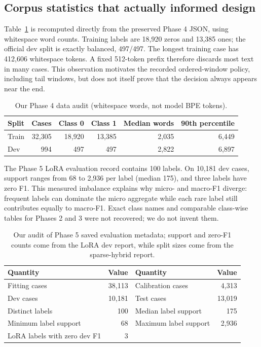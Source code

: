 \documentclass[11pt,oneside]{article}
\begin{document}
\subsection{Corpus statistics that actually informed design}
Table~\ref{tab:data} is recomputed directly from the preserved Phase 4 JSON, using whitespace word counts. Training labels are 18,920 zeros and 13,385 ones; the official dev split is exactly balanced, 497/497. The longest training case has 412,606 whitespace tokens. A fixed 512-token prefix therefore discards most text in many cases. This observation motivates the recorded ordered-window policy, including tail windows, but does not itself prove that the decision always appears near the end.
\begin{table}[h]
\centering\small
\caption{Our Phase 4 data audit (whitespace words, not model BPE tokens).}
\label{tab:data}
\begin{tabular}{lrrrrr}\toprule Split & Cases & Class 0 & Class 1 & Median words & 90th percentile \\\midrule
Train & 32,305 & 18,920 & 13,385 & 2,035 & 6,449 \\
Dev & 994 & 497 & 497 & 2,822 & 6,897 \\
\bottomrule\end{tabular}
\end{table}
The Phase 5 LoRA evaluation record contains 100 labels. On 10,181 dev cases, support ranges from 68 to 2,936 per label (median 175), and three labels have zero F1. This measured imbalance explains why micro- and macro-F1 diverge: frequent labels can dominate the micro aggregate while each rare label still contributes equally to macro-F1. Exact class names and comparable class-wise tables for Phases 2 and 3 were not recovered; we do not invent them.
\begin{table}[h]
\centering\small
\caption{Our audit of Phase 5 saved evaluation metadata; support and zero-F1 counts come from the LoRA dev report, while split sizes come from the sparse-hybrid report.}
\label{tab:phase5data}
\begin{tabular}{lr@{\qquad}lr}\toprule Quantity & Value & Quantity & Value \\\midrule
Fitting cases & 38,113 & Calibration cases & 4,313 \\
Dev cases & 10,181 & Test cases & 13,019 \\
Distinct labels & 100 & Median label support & 175 \\
Minimum label support & 68 & Maximum label support & 2,936 \\
LoRA labels with zero dev F1 & 3 & & \\
\bottomrule\end{tabular}
\end{table}
\end{document}
